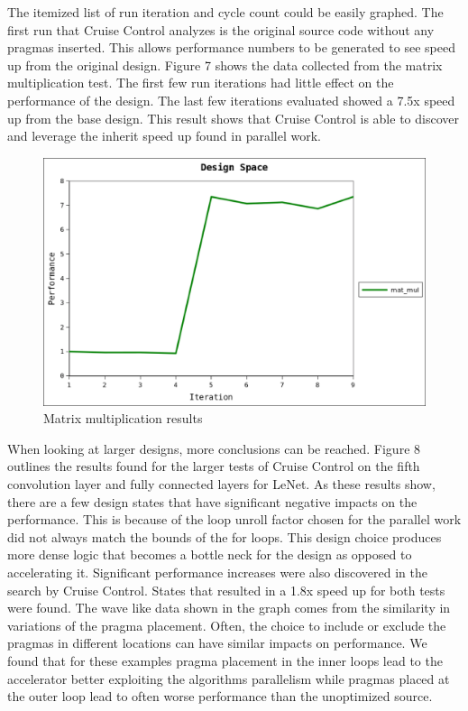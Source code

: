 \documentclass[letterpaper, 10 pt, conference]{IEEEconf}  %
\begin{document}
The itemized list of run iteration and cycle count could be easily graphed. The first run that Cruise Control analyzes is the original source code without any pragmas inserted. This allows performance numbers to be generated to see speed up from the original design. Figure 7 shows the data collected from the matrix multiplication test. The first few run iterations had little effect on the performance of the design. The last few iterations evaluated showed a 7.5x speed up from the base design. This result shows that Cruise Control is able to discover and leverage the inherit speed up found in parallel work. \newline 

\begin{figure}[H]
\centering
\includegraphics[scale=.4]{result1.png} 
\caption{Matrix multiplication results}
\end{figure}

When looking at larger designs, more conclusions can be reached. Figure 8 outlines the results found for the larger tests of Cruise Control on the fifth convolution layer and fully connected layers for LeNet. As these results show, there are a few design states that have significant negative impacts on the performance. This is because of the loop unroll factor chosen for the parallel work did not always match the bounds of the for loops. This design choice produces more dense logic that becomes a bottle neck for the design as opposed to accelerating it. Significant performance increases were also discovered in the search by Cruise Control. States that resulted in a 1.8x speed up for both tests were found. The wave like data shown in the graph comes from the similarity in variations of the pragma placement. Often, the choice to include or exclude the pragmas in different locations can have similar impacts on performance. We found that for these examples pragma placement in the inner loops lead to the accelerator better exploiting the algorithms parallelism while pragmas placed at the outer loop lead to often worse performance than the unoptimized source.\newline
\end{document}
